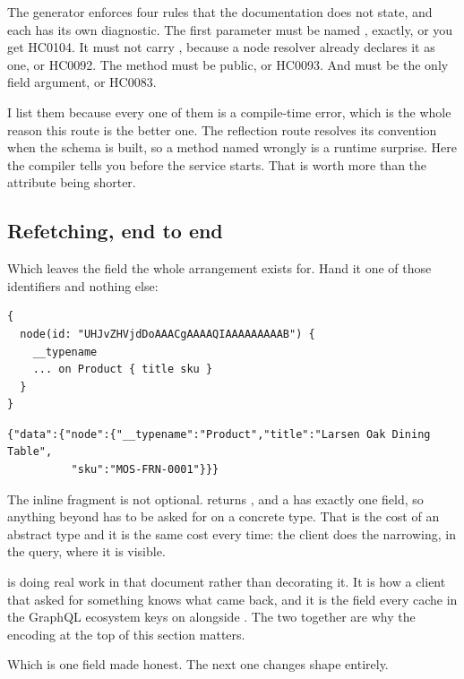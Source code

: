 %
The generator enforces four rules that the documentation does not state, and
each has its own diagnostic. The first parameter must be named ,
exactly, or you get HC0104. It must not carry \code{[ID]}, because a node
resolver already declares it as one, or HC0092. The method must be public, or
HC0093. And  must be the only field argument, or HC0083.

I list them because every one of them is a compile-time error, which is the
whole reason this route is the better one. The reflection route resolves its
convention when the schema is built, so a method named wrongly is a runtime
surprise. Here the compiler tells you before the service starts. That is worth
more than the attribute being shorter.

\subsection*{Refetching, end to end}

%
Which leaves the field the whole arrangement exists for. Hand it one of those
identifiers and nothing else:

\begin{verbatim}
{
  node(id: "UHJvZHVjdDoAAACgAAAAQIAAAAAAAAAB") {
    __typename
    ... on Product { title sku }
  }
}
\end{verbatim}

\begin{verbatim}
{"data":{"node":{"__typename":"Product","title":"Larsen Oak Dining Table",
          "sku":"MOS-FRN-0001"}}}
\end{verbatim}

The inline fragment is not optional.  returns , and a
 has exactly one field, so anything beyond  has to be asked
for on a concrete type. That is the cost of an abstract type and it is the same
cost every time: the client does the narrowing, in the query, where it is
visible.

 is doing real work in that document rather than decorating it.
It is how a client that asked  for something knows what came back,
and it is the field every cache in the GraphQL ecosystem keys on alongside
. The two together are why the encoding at the top of this section
matters.

Which is one field made honest. The next one changes shape entirely.
